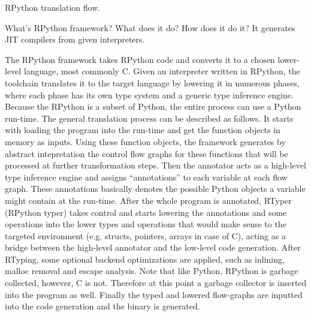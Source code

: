         \begin{figure-here}
            RPython translation flow.
        \end{figure-here}

        \begin{paragraph-here}
            What's RPython framework? What does it do? How does it do it? It generates JIT compilers from given interpreters.

            The RPython framework takes RPython code and converts it to a chosen
            lower-level language, most commonly C. Given an interpreter written in
            RPython, the toolchain translates it to the target language by
            lowering it in numerous phases, where each phase has its own type
            system and a generic type inference engine. Because the RPython is a
            subset of Python, the entire process can use a Python run-time. The
            general translation process can be described as follows. It starts
            with loading the program into the run-time and get the function
            objects in memory as inputs. Using these function objects, the
            framework generates by abstract intepretation the control flow graphs
            for these functions that will be processed at further transformation
            steps. Then the annotator acts as a high-level type inference engine
            and assigns ``annotations'' to each variable at each flow graph. These
            annotations basically denotes the possible Python objects a variable
            might contain at the run-time. After the whole program is annotated,
            RTyper (RPython typer) takes control and starts lowering the
            annotations and some operations into the lower types and operations
            that would make sense to the targeted environment (e.g. structs,
            pointers, arrays in case of C), acting as a bridge between the
            high-level annotator and the low-level code generation. After RTyping,
            some optional backend optimizations are applied, such as inlining,
            malloc removal and escape analysis. Note that like Python, RPython is
            garbage collected, however, C is not. Therefore at this point a
            garbage collector is inserted into the program as well. Finally the
            typed and lowered flow-graphs are inputted into the code generation
            and the binary is generated. \cite{rpython07, pypy06, pypy08}
        \end{paragraph-here}



